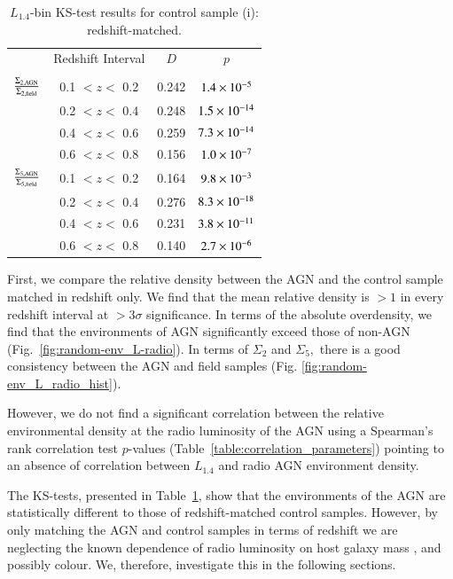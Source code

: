 \begin{table}
\centering
\caption[Sample (i): L$_{1.4}$-bin KS-test results]{$L_{1.4}$-bin KS-test results for control sample (i): redshift-matched.}
\label{table:sample1b}
\begin{tabular}{ c | c c c }
\hline \hline
  & Redshift Interval & $D$ & $p$ \\
  & & & \\
  \hline
   $\frac{\Sigma_{2,{\rm AGN}}}{\Sigma_{2,{\rm field}}}$ 				& 0.1 $< z <$ 0.2  &	0.242  &  $1.4\times 10^{-5}$ \\	
   						 	& 0.2 $< z <$ 0.4  &	0.248  &  $1.5\times 10^{-14}$ \\	
   							& 0.4 $< z <$ 0.6  & 	0.259  &  $7.3\times 10^{-14}$ \\	
   							& 0.6 $< z <$ 0.8  &  0.156  &  $1.0\times 10^{-7}$ \\	
  \hline
  $\frac{\Sigma_{5,{\rm AGN}}}{\Sigma_{5,{\rm field}}}$ 				& 0.1 $< z <$ 0.2  &	0.164  &  $9.8\times 10^{-3}$ \\	
   							& 0.2 $< z <$ 0.4  & 	0.276  &  $8.3\times 10^{-18}$ \\	
   							& 0.4 $< z <$ 0.6  & 	0.231  &  $3.8\times 10^{-11}$ \\ 	
   							& 0.6 $< z <$ 0.8  &  0.140  &  $2.7\times 10^{-6}$ \\	
  \hline
  \end{tabular}
\end{table}

First, we compare the relative density between the AGN and the control sample matched in redshift only. We find that the mean relative density is $>1$ in every redshift interval at $>3\sigma$ significance. In terms of the absolute overdensity, we find that the environments of AGN significantly exceed those of non-AGN (Fig.~\ref{fig:random-env_L-radio}). In terms of $\Sigma_2$ and $\Sigma_5,$ there is a good consistency between the AGN and field samples (Fig. \ref{fig:random-env_L_radio_hist}). 

However, we do not find a significant correlation between the relative environmental density at the radio luminosity of the AGN using a Spearman's rank correlation test $p$-values (Table~\ref{table:correlation_parameters}) pointing to an absence of correlation between $L_{1.4}$ and radio AGN environment density. 

The KS-tests, presented in Table~\ref{table:sample1b}, show that the environments of the AGN are statistically different to those of redshift-matched control samples. However, by only matching the AGN and control samples in terms of redshift we are neglecting the known dependence of radio luminosity on host galaxy mass \citep[e.g.][]{mclure2004,WilliamsRottgering2015}, and possibly colour. We, therefore, investigate this in the following sections. 

